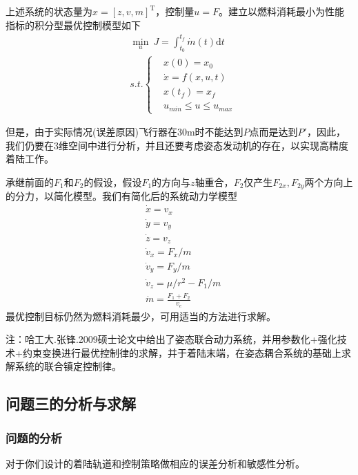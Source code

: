             上述系统的状态量为$x = [z,v,m]^\mathrm{T}$，控制量$u = F$。建立以燃料消耗最小为性能指标的积分型最优控制模型如下
            \begin{align*}
            & \min_u\ J = \int_{t_0}^{t_f} \dot{m}(t)\mathrm{d}t\\
            & s.t.\left\{
            \begin{aligned}
            & x(0) = x_0\\
            & \dot{x} = f(x,u,t)\\
            & x(t_f) = x_f\\
            & u_{min} \leqslant u \leqslant u_{max}
            \end{aligned}
            \right.
            \end{align*}
            \par
            但是，由于实际情况(误差原因)飞行器在30m时不能达到$P$点而是达到$P'$，因此，我们仍要在3维空间中进行分析，并且还要考虑姿态发动机的存在，以实现高精度着陆工作。
            \par
            承继前面的$F_1$和$F_2$的假设，假设$F_1$的方向与$z$轴重合，$F_2$仅产生$F_{2x},F_{2y}$两个方向上的分力，以简化模型。我们有简化后的系统动力学模型
            \begin{align*}
            & \dot{x} = v_x\\
            & \dot{y} = v_y\\
            & \dot{z} = v_z\\
            & \dot{v}_x = F_x/m\\
            & \dot{v}_y = F_y/m\\
            & \dot{v}_z = \mu/r^2 - F_1/m\\
            & \dot{m} = \frac{F_1+F_2}{v_e}
            \end{align*}
            最优控制目标仍然为燃料消耗最少，可用适当的方法进行求解。
            \par
            注：哈工大.张锋.2009硕士论文中给出了姿态联合动力系统，并用参数化+强化技术+约束变换进行最优控制律的求解，并于着陆末端，在姿态耦合系统的基础上求解系统的联合镇定控制律。

    \subsection{问题三的分析与求解}
        \subsubsection{问题的分析}
            \par
            对于你们设计的着陆轨道和控制策略做相应的误差分析和敏感性分析。

% 
